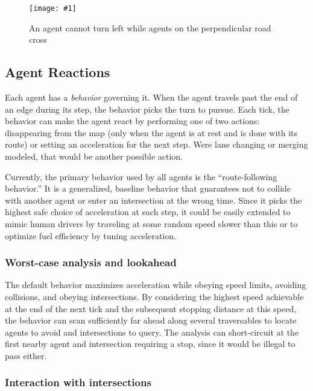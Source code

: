 \documentclass[letterpaper, 10 pt, conference]{ieeeconf}  %
\newcommand{\pix}[3]{
  \begin{figure}[h]
    \centering \texttt{[image: \#1]}
    \caption{#2}
  \end{figure}
}
\begin{document}
\pix{turn_conflicts.png}
    {An agent cannot turn left while agents on the perpendicular road cross}
    {scale=0.5}

\subsection{Agent Reactions}

Each agent has a \emph{behavior} governing it. When the agent travels past the end
of an edge during its step, the behavior picks the turn to pursue. Each tick,
the behavior can make the agent react by performing one of two actions:
disappearing from the map (only when the agent is at rest and is done with its
route) or setting an acceleration for the next step. Were lane changing or
merging modeled, that would be another possible action.

Currently, the primary behavior used by all agents is the ``route-following
behavior.'' It is a generalized, baseline behavior that guarantees not to
collide with another agent or enter an intersection at the wrong time. Since it
picks the highest safe choice of acceleration at each step, it could be easily
extended to mimic human drivers by traveling at some random speed slower than
this or to optimize fuel efficiency by tuning acceleration.

\subsubsection{Worst-case analysis and lookahead}


The default behavior maximizes acceleration while obeying speed limits,
avoiding collisions, and obeying intersections. By considering the highest speed
achievable at the end of the next tick and the subsequent stopping distance at
this speed, the behavior can scan sufficiently far ahead along several
traversables to locate agents to avoid and intersections to query. The analysis
can short-circuit at the first nearby agent and intersection requiring a stop,
since it would be illegal to pass either.

\subsubsection{Interaction with intersections}

\end{document}
